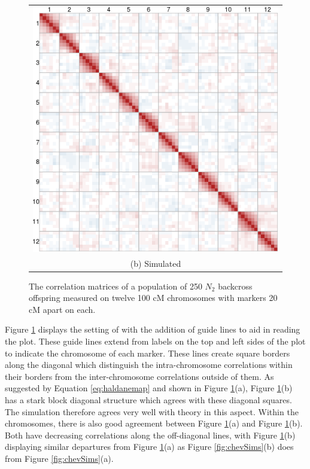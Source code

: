 \documentclass[sts]{imsart}
\begin{document}
\begin{figure}[h!]
\begin{center}
\begin{tabular}{c}
      \includegraphics[scale=0.35]{../img/LBSim.png} \\
      {\footnotesize (b) Simulated} \\
    \end{tabular}
  \end{center}
  \caption{The correlation matrices of a population of 250 $N_2$ backcross offspring measured on twelve 100 cM chromosomes with markers 20 cM apart on each.}
  \label{fig:LBSims}
\end{figure}

Figure \ref{fig:LBSims} displays the setting of \cite{LanderBotstein1989} with the addition of guide lines to aid in reading the plot. These guide lines extend from labels on the top and left sides of the plot to indicate the chromosome of each marker. These lines create square borders along the diagonal which distinguish the intra-chromosome correlations within their borders from the inter-chromosome correlations outside of them. As suggested by Equation \ref{eq:haldanemap} and shown in Figure \ref{fig:LBSims}(a), Figure \ref{fig:LBSims}(b) has a stark block diagonal structure which agrees with these diagonal squares. The simulation therefore agrees very well with theory in this aspect. Within the chromosomes, there is also good agreement between Figure \ref{fig:LBSims}(a) and Figure \ref{fig:LBSims}(b). Both have decreasing correlations along the off-diagonal lines, with Figure \ref{fig:LBSims}(b) displaying similar departures from Figure \ref{fig:LBSims}(a) as Figure \ref{fig:chevSims}(b) does from Figure \ref{fig:chevSims}(a).
\end{document}
